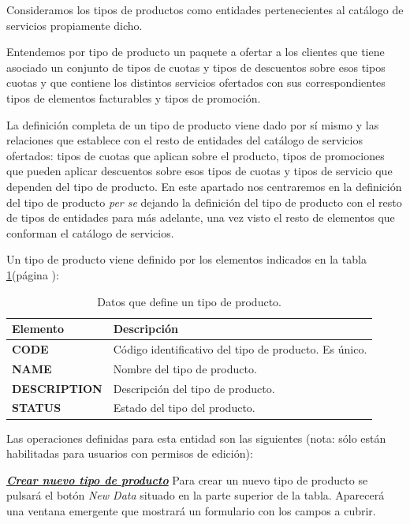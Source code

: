 Consideramos los tipos de productos como entidades pertenecientes al catálogo de servicios propiamente dicho.

Entendemos por tipo de producto un paquete a ofertar a los clientes que tiene asociado un conjunto de tipos de cuotas y tipos de descuentos sobre esos tipos cuotas y que contiene los distintos servicios ofertados con sus correspondientes tipos de elementos facturables y tipos de promoción.

La definición completa de un tipo de producto viene dado por sí mismo y las relaciones que establece con el resto de entidades del catálogo de servicios ofertados: tipos de cuotas que aplican sobre el producto, tipos de promociones que pueden aplicar descuentos sobre esos tipos de cuotas y tipos de servicio que dependen del tipo de producto. En este apartado nos centraremos en la definición del tipo de producto \textit{per se} dejando la definición del tipo de producto con el resto de tipos de entidades para más adelante, una vez visto el resto de elementos que conforman el catálogo de servicios.

Un tipo de producto viene definido por los elementos indicados en la tabla \ref{tab:tipo-producto}(página \pageref{tab:tipo-producto}):



\begin{table}[H]
  \centering
  \setlength{\leftmargini}{0.4cm}
  \resizebox{14cm}{!} {
  \begin{tabular}{|m{3cm} m{11cm}|}
  \rowcolor{udcpink!25}
  \hline
  	\textbf{Elemento} & \textbf{Descripción} \\\hline
	\textbf{CODE} & Código identificativo del tipo de producto. Es único.   \\
	\textbf{NAME} & Nombre del tipo de producto. \\
	\textbf{DESCRIPTION} & Descripción del tipo de producto. \\		
	\textbf{STATUS} & Estado del tipo del producto.
	\\\hline
  \end{tabular}
  } %
  \caption{Datos que define un tipo de producto.}
  \label{tab:tipo-producto}
\end{table}

Las operaciones definidas para esta entidad son las siguientes (nota: sólo están habilitadas para usuarios con permisos de edición):

\underline{\textsl{\textbf{Crear nuevo tipo de producto}}}\newline
Para crear un nuevo tipo de producto se pulsará el botón \textit{New Data} situado en la parte superior de la tabla. Aparecerá una ventana emergente que mostrará un formulario con los campos a cubrir.

